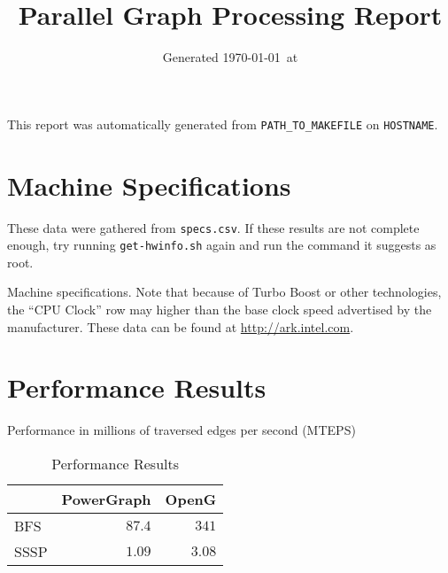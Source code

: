 \documentclass[11pt]{article}
\begin{document}
\title{Parallel Graph Processing Report\vspace{-2em}}
\author{}
\date{Generated \today\ at \currenttime}
\maketitle

This report was automatically generated from \verb|PATH_TO_MAKEFILE| on \verb|HOSTNAME|.

\section{Machine Specifications}
These data were gathered from \verb|specs.csv|. If these results are not complete enough, try running \verb|get-hwinfo.sh| again and run the command it suggests as root.

\begin{table}[htb]
	\centering
	\caption{Machine specifications. Note that because of Turbo Boost or other technologies, the ``CPU Clock'' row may higher than the base clock speed advertised by the manufacturer. These data can be found at \url{http://ark.intel.com}.}
	\label{tab:specs}
\end{table}

\section{Performance Results}
Performance in millions of traversed edges per second (MTEPS)

\begin{table}[htb]
	\centering
	\begin{tabular}{l|r|r|}
	 & PowerGraph & OpenG \\ \hline
	BFS & $87.4$ & $341$ \\ \hline
	SSSP & $1.09$ & $3.08$ \\ \hline
	\end{tabular}
	\caption{Performance Results}
	\label{tab:perf}
\end{table}
\end{document}
